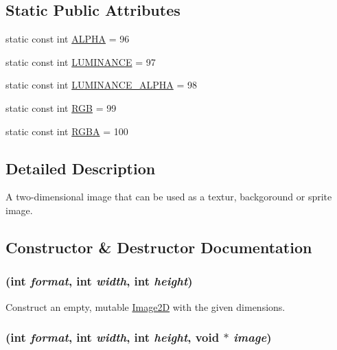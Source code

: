 \subsection*{Static Public Attributes}
\begin{CompactItemize}
\item 
static const int \hyperlink{classm3g_1_1Image2D_417581fcde4067111f47320edb2aa378}{ALPHA} = 96
\item 
static const int \hyperlink{classm3g_1_1Image2D_3cf02f5117269e8ff112cbf5ecb790cd}{LUMINANCE} = 97
\item 
static const int \hyperlink{classm3g_1_1Image2D_1a74b878039f244c27120cacb4eb6a3e}{LUMINANCE\_\-ALPHA} = 98
\item 
static const int \hyperlink{classm3g_1_1Image2D_5f237f1b0f2ce6351e9e4a494b8dc759}{RGB} = 99
\item 
static const int \hyperlink{classm3g_1_1Image2D_0aaf9f2f4c064633c6d2888ec2c39e92}{RGBA} = 100
\end{CompactItemize}


\subsection{Detailed Description}
A two-dimensional image that can be used as a textur, backgoround or sprite image. 

\subsection{Constructor \& Destructor Documentation}
\hypertarget{classm3g_1_1Image2D_cea21be298c6584490d2b714c4b29d6b}{
\subsubsection[{Image2D}]{ (int {\em format}, \/  int {\em width}, \/  int {\em height})}}
\label{classm3g_1_1Image2D_cea21be298c6584490d2b714c4b29d6b}


Construct an empty, mutable \hyperlink{classm3g_1_1Image2D}{Image2D} with the given dimensions. \hypertarget{classm3g_1_1Image2D_8cf9a47f24ed50fe66686c1117fb048c}{
\subsubsection[{Image2D}]{ (int {\em format}, \/  int {\em width}, \/  int {\em height}, \/  void $\ast$ {\em image})}}
\label{classm3g_1_1Image2D_8cf9a47f24ed50fe66686c1117fb048c}


